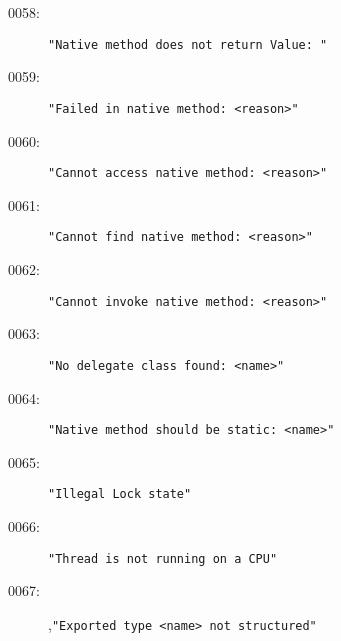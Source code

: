 \begin{description}
\item[0058:] \texttt{"Native method does not return Value:\ "}
\item[0059:] \texttt{"Failed in native method:\ <reason>"}
\item[0060:] \texttt{"Cannot access native method:\ <reason>"}
\item[0061:] \texttt{"Cannot find native method:\ <reason>"}
\item[0062:] \texttt{"Cannot invoke native method:\ <reason>"}
\item[0063:] \texttt{"No delegate class found:\ <name>"}
\item[0064:] \texttt{"Native method should be static:\ <name>"}
\item[0065:] \texttt{"Illegal Lock state"}
\item[0066:] \texttt{"Thread is not running on a CPU"}
\item[0067:],\texttt{"Exported type <name> not structured"}
\end{description}
